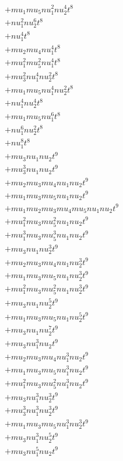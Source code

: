 \begin{align*}
  + mu_1 mu_5 nu_1^{2} nu_2^{4} t^{8} \\
  + nu_1^{2} nu_2^{6} t^{8} \\
  + nu_1^{4} t^{8} \\
  + mu_2 mu_4 nu_1^{4} t^{8} \\
  + mu_1^{2} mu_5^{2} nu_1^{4} t^{8} \\
  + mu_3^{2} nu_1^{4} nu_2^{2} t^{8} \\
  + mu_1 mu_5 nu_1^{4} nu_2^{2} t^{8} \\
  + nu_1^{4} nu_2^{4} t^{8} \\
  + mu_1 mu_5 nu_1^{6} t^{8} \\
  + nu_1^{6} nu_2^{2} t^{8} \\
  + nu_1^{8} t^{8} \\
  + mu_3 nu_1 nu_2 t^{9} \\
  + mu_3^{3} nu_1 nu_2 t^{9} \\
  + mu_2 mu_3 mu_4 nu_1 nu_2 t^{9} \\
  + mu_1 mu_3 mu_5 nu_1 nu_2 t^{9} \\
  + mu_1 mu_2 mu_3 mu_4 mu_5 nu_1 nu_2 t^{9} \\
  + mu_1^{2} mu_3 mu_5^{2} nu_1 nu_2 t^{9} \\
  + mu_1^{3} mu_3 mu_5^{3} nu_1 nu_2 t^{9} \\
  + mu_3 nu_1 nu_2^{3} t^{9} \\
  + mu_2 mu_3 mu_4 nu_1 nu_2^{3} t^{9} \\
  + mu_1 mu_3 mu_5 nu_1 nu_2^{3} t^{9} \\
  + mu_1^{2} mu_3 mu_5^{2} nu_1 nu_2^{3} t^{9} \\
  + mu_3 nu_1 nu_2^{5} t^{9} \\
  + mu_1 mu_3 mu_5 nu_1 nu_2^{5} t^{9} \\
  + mu_3 nu_1 nu_2^{7} t^{9} \\
  + mu_3 nu_1^{3} nu_2 t^{9} \\
  + mu_2 mu_3 mu_4 nu_1^{3} nu_2 t^{9} \\
  + mu_1 mu_3 mu_5 nu_1^{3} nu_2 t^{9} \\
  + mu_1^{2} mu_3 mu_5^{2} nu_1^{3} nu_2 t^{9} \\
  + mu_3 nu_1^{3} nu_2^{3} t^{9} \\
  + mu_3^{3} nu_1^{3} nu_2^{3} t^{9} \\
  + mu_1 mu_3 mu_5 nu_1^{3} nu_2^{3} t^{9} \\
  + mu_3 nu_1^{3} nu_2^{5} t^{9} \\
  + mu_3 nu_1^{5} nu_2 t^{9} \\

\end{align*}
